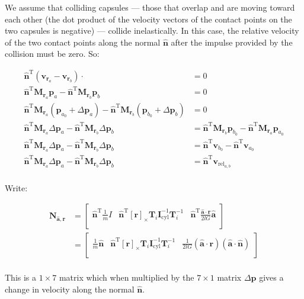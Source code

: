 \documentclass{report}
\renewcommand{\vec}[1]{\mathbf{#1}}
\let\oldhat\hat
\renewcommand{\hat}[1]{\oldhat{\mathbf{#1}}}
\newcommand{\deltap}{\Delta \vec{p}}
\newcommand{\IInv}{\mathbf{I}^{-1}}
\newcommand{\nT}{\hat{n}^\textrm{T}}
\newcommand{\rx}{{\left[\vec{r}\right]}_\times}
\begin{document}
We assume that colliding capsules --- those that overlap and are
moving toward each other (the dot product of the velocity vectors of
the contact points on the two capsules is negative) --- collide
inelastically.  In this case, the relative velocity of the two contact
points along the normal $\hat{n}$ after the impulse provided by the
collision must be zero.  So:

\begin{align*}
\nT\left(\vec{v}_{\vec{r}_a} - \vec{v}_{\vec{r}_b}\right) \cdot &= 0 \\
\nT \vec{M}_{\vec{r}_a} \vec{p}_a - \nT \vec{M}_{\vec{r}_b} \vec{p}_b &= 0 \\
\nT \vec{M}_{\vec{r}_a} \left( \vec{p}_{a_0} + \deltap_a \right) - \nT \vec{M}_{\vec{r}_b} \left( \vec{p}_{b_0} + \deltap_b \right) &= 0 \\
\nT \vec{M}_{\vec{r}_a} \deltap_a - \nT \vec{M}_{\vec{r}_b} \deltap_b &= \nT \vec{M}_{\vec{r}_b} \vec{p}_{b_0} - \nT \vec{M}_{\vec{r}_a} \vec{p}_{a_0} \\
\nT \vec{M}_{\vec{r}_a} \deltap_a - \nT \vec{M}_{\vec{r}_b} \deltap_b &= \nT \vec{v}_{b_0} - \nT \vec{v}_{a_0} \\
\nT \vec{M}_{\vec{r}_a} \deltap_a - \nT \vec{M}_{\vec{r}_b} \deltap_b &= \nT \vec{v}_{\textrm{rel}_{a,b}} \\
\end{align*}

Write:

\begin{align*}
\vec{N}_{\hat{a},{\vec{r}}}
&=
\left[
\begin{array}{ccc}
\nT \frac{1}{m}I &
\nT \rx \mathbf{T}_i \IInv_\textrm{cyl} \mathbf{T}_i^{-1} &
\nT \frac{\hat{a}\cdot\vec{r}}{2lG}\hat{a}\\
\end{array}
\right] \\
&=
\left[
\begin{array}{ccc}
\frac{1}{m} \hat{n} &
\nT \rx \mathbf{T}_i \IInv_\textrm{cyl} \mathbf{T}_i^{-1} &
\frac{1}{2lG}\left(\hat{a}\cdot\vec{r}\right)\left(\hat{a}\cdot\hat{n}\right)\\
\end{array}
\right] \\
\end{align*}

This is a $1\times7$ matrix which when multiplied by the $7\times1$
matrix $\deltap$ gives a change in velocity along the normal $\hat{n}$.
\end{document}
